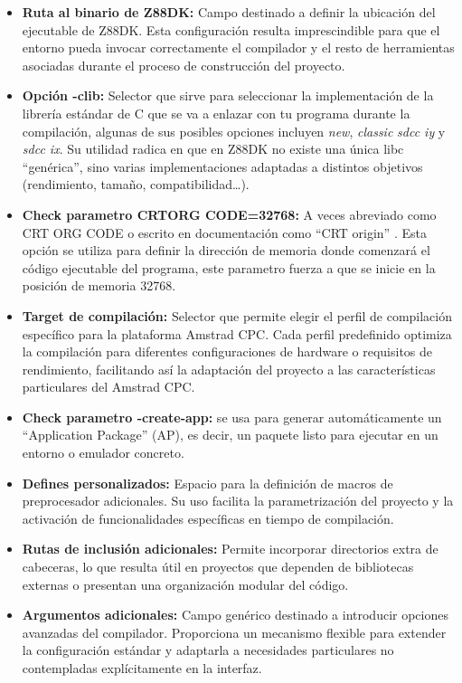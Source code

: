 \documentclass[../main.tex]{subfiles}
\begin{document}
\begin{itemize}
    \item \textbf{Ruta al binario de Z88DK:} Campo destinado a definir la ubicación del ejecutable de Z88DK. Esta configuración resulta imprescindible para que el entorno pueda invocar correctamente el compilador y el resto de herramientas asociadas durante el proceso de construcción del proyecto.

    \item \textbf{Opción -clib:} Selector que sirve para seleccionar la implementación de la librería estándar de C que se va a enlazar con tu programa durante la compilación, algunas de sus posibles opciones incluyen \textit{new}, \textit{classic} \textit{sdcc iy} y \textit{sdcc ix}. Su utilidad radica en que en Z88DK no existe una única libc “genérica”, sino varias implementaciones adaptadas a distintos objetivos (rendimiento, tamaño, compatibilidad…).

    \item \textbf{Check parametro CRTORG CODE=32768:} A veces abreviado como CRT ORG CODE o escrito en documentación como ``CRT origin'' \cite{z88dk_crt}. Esta opción se utiliza para definir la dirección de memoria donde comenzará el código ejecutable del programa, este parametro fuerza a que se inicie en la posición de memoria 32768.

    \item \textbf{Target de compilación:} Selector que permite elegir el perfil de compilación específico para la plataforma Amstrad CPC. Cada perfil predefinido optimiza la compilación para diferentes configuraciones de hardware o requisitos de rendimiento, facilitando así la adaptación del proyecto a las características particulares del Amstrad CPC.

    \item \textbf{Check parametro -create-app:} se usa para generar automáticamente un ``Application Package'' (AP), es decir, un paquete listo para ejecutar en un entorno o emulador concreto.

    \item \textbf{Defines personalizados:} Espacio para la definición de macros de preprocesador adicionales. Su uso facilita la parametrización del proyecto y la activación de funcionalidades específicas en tiempo de compilación.

    \item \textbf{Rutas de inclusión adicionales:} Permite incorporar directorios extra de cabeceras, lo que resulta útil en proyectos que dependen de bibliotecas externas o presentan una organización modular del código.

    \item \textbf{Argumentos adicionales:} Campo genérico destinado a introducir opciones avanzadas del compilador. Proporciona un mecanismo flexible para extender la configuración estándar y adaptarla a necesidades particulares no contempladas explícitamente en la interfaz.
\end{itemize}
\end{document}
